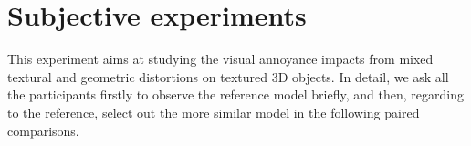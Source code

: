 \section{Subjective experiments}
This experiment aims at studying the visual annoyance impacts from mixed textural and geometric distortions on textured 3D objects. In detail, we ask all the participants firstly to observe the reference model briefly, and then, regarding to the reference, select out the more similar model in the following paired comparisons. 